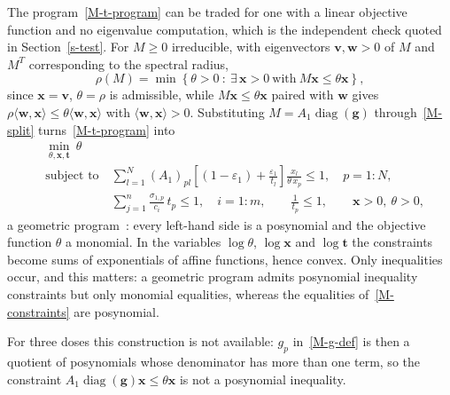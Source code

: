 \documentclass[11pt]{article}
\theoremstyle{plain}
\theoremstyle{remark}
\numberwithin{equation}{section}
\begin{document}
The program~\eqref{M-t-program} can be traded for one with a linear objective
function and no eigenvalue computation, which is the independent check quoted
in Section~\ref{s-test}. For $M\ge 0$ irreducible, with eigenvectors
$\bm v,\bm w>0$ of $M$ and $M^T$ corresponding to the spectral radius,
\begin{equation}\label{s-cw}
\rho(M)=\min\left\{\theta>0\ :\ \exists\,\bm x>0\ \mbox{with}\
M\bm x\le\theta\bm x\right\},
\end{equation}
since $\bm x=\bm v$, $\theta=\rho$ is admissible, while $M\bm x\le\theta\bm x$
paired with $\bm w$ gives
$\rho\langle\bm w,\bm x\rangle\le\theta\langle\bm w,\bm x\rangle$ with
$\langle\bm w,\bm x\rangle>0$. Substituting $M=A_1\operatorname{diag}(\bm g)$
through~\eqref{M-split} turns~\eqref{M-t-program} into
\begin{equation}\label{s-gp-eq}
\begin{aligned}
&\min_{\theta,\bm x,\bm t}\ \theta\\
&\mbox{subject to}\quad
\sum_{l=1}^{N}\left(A_1\right)_{pl}
\left\lbrack(1-\varepsilon_1)+\frac{\varepsilon_1}{t_l}\right\rbrack
\frac{x_l}{\theta\,x_p}\le 1,\quad p=1:N,\\
&\phantom{\mbox{subject to}}\quad
\sum_{j=1}^{n}\frac{\sigma_{1,p}}{c_i}\,t_p\le 1,\quad i=1:m,\qquad
\frac{1}{t_p}\le 1,\qquad \bm x>0,\ \theta>0,
\end{aligned}
\end{equation}
a geometric program~\cite{2007Boyd_gp}: every left-hand side is a posynomial
and the objective function $\theta$ a monomial. In the variables $\log\theta$,
$\log\bm x$ and $\log\bm t$ the constraints become sums of exponentials of
affine functions, hence convex. Only inequalities occur, and this matters: a
geometric program admits posynomial inequality constraints but only monomial
equalities, whereas the equalities of~\eqref{M-constraints} are posynomial.

For three doses this construction is not available: $g_p$ in~\eqref{M-g-def} is
then a quotient of posynomials whose denominator has more than one term, so the
constraint $A_1\operatorname{diag}(\bm g)\bm x\le\theta\bm x$ is not a
posynomial inequality.



\end{document}
